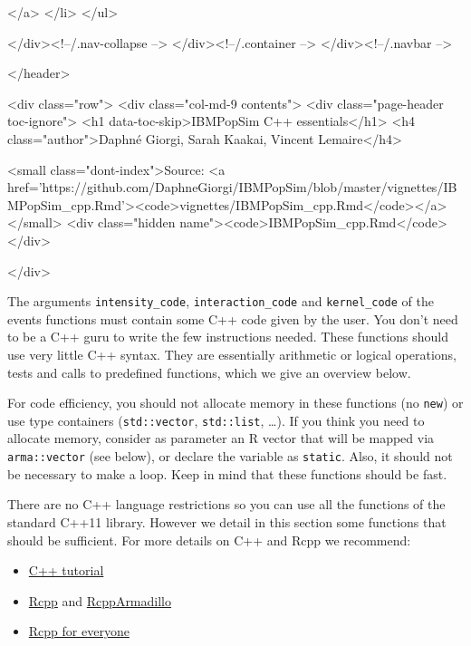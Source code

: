   </a>
</li>
      </ul>
      
    </div><!--/.nav-collapse -->
  </div><!--/.container -->
</div><!--/.navbar -->

      

      </header>


<div class="row">
  <div class="col-md-9 contents">
    <div class="page-header toc-ignore">
      <h1 data-toc-skip>IBMPopSim C++ essentials</h1>
                        <h4 class="author">Daphné Giorgi, Sarah Kaakai, Vincent Lemaire</h4>
            
      
      <small class="dont-index">Source: <a href='https://github.com/DaphneGiorgi/IBMPopSim/blob/master/vignettes/IBMPopSim_cpp.Rmd'><code>vignettes/IBMPopSim_cpp.Rmd</code></a></small>
      <div class="hidden name"><code>IBMPopSim_cpp.Rmd</code></div>

    </div>

    
    
The arguments \texttt{intensity\_code}, \texttt{interaction\_code} and \texttt{kernel\_code} of the events functions must contain some C++ code given by the user. You don't need to be a C++ guru to write the few instructions needed. These functions should use very little C++ syntax. They are essentially arithmetic or logical operations, tests and calls to predefined functions, which we give an overview below.

For code efficiency, you should not allocate memory in these functions (no \texttt{new}) or use type containers (\texttt{std::vector}, \texttt{std::list}, \ldots). If you think you need to allocate memory, consider as parameter an R vector that will be mapped via \texttt{arma::vector} (see below), or declare the variable as \texttt{static}.
Also, it should not be necessary to make a loop. Keep in mind that these functions should be fast.

There are no C++ language restrictions so you can use all the functions of the standard C++11 library. However we detail in this section some functions that should be sufficient. For more details on C++ and Rcpp we recommend:

\begin{itemize}
\tightlist
\item
  \href{https://www.cplusplus.com/doc/tutorial/}{C++ tutorial}
\item
  \href{http://dirk.eddelbuettel.com/code/rcpp.html}{Rcpp} and \href{http://dirk.eddelbuettel.com/code/rcpp.armadillo.html}{RcppArmadillo}
\item
  \href{https://teuder.github.io/rcpp4everyone_en/}{Rcpp for everyone}
\end{itemize}

